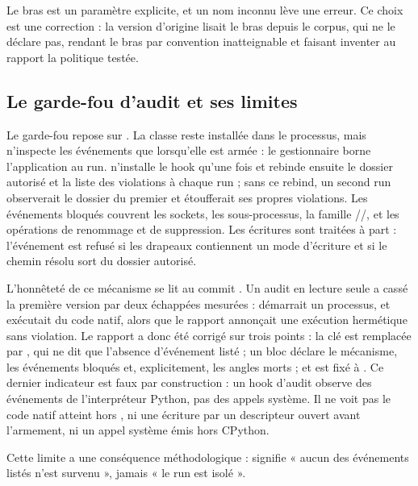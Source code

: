 Le bras est un paramètre explicite, et un nom inconnu lève une erreur. Ce choix
est une correction : la version d'origine lisait le bras depuis le corpus, qui
ne le déclare pas, rendant le bras par convention inatteignable et faisant
inventer au rapport la politique testée.

\subsection{Le garde-fou d'audit et ses limites}

Le garde-fou repose sur . La classe  reste
installée dans le processus, mais n'inspecte les événements que lorsqu'elle est
armée : le gestionnaire  borne l'application au run.
 n'installe le hook qu'une fois et rebinde ensuite le
dossier autorisé et la liste des violations à chaque run ; sans ce rebind, un
second run observerait le dossier du premier et étoufferait ses propres
violations. Les événements bloqués couvrent les sockets, les sous-processus, la
famille //,  et les
opérations de renommage et de suppression. Les écritures sont traitées à part :
l'événement  est refusé si les drapeaux contiennent un mode
d'écriture et si le chemin résolu sort du dossier autorisé.

L'honnêteté de ce mécanisme se lit au commit . Un audit en lecture
seule a cassé la première version par deux échappées mesurées :
 démarrait un processus, et 
exécutait du code natif, alors que le rapport annonçait une exécution hermétique
sans violation. Le rapport a donc été corrigé sur trois points : la clé
 est remplacée par , qui ne dit que l'absence
d'événement listé ; un bloc  déclare le mécanisme, les événements
bloqués et, explicitement, les angles morts ; et  est
fixé à . Ce dernier indicateur est faux par construction : un hook
d'audit observe des événements de l'interpréteur Python, pas des appels système.
Il ne voit pas le code natif atteint hors , ni une écriture par un
descripteur ouvert avant l'armement, ni un appel système émis hors CPython.

Cette limite a une conséquence méthodologique : 
signifie « aucun des événements listés n'est survenu », jamais « le run est
isolé ».

